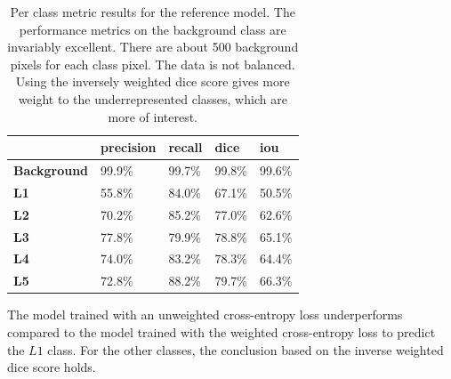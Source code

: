 \begin{table}
    \begin{tabular}{l|llll}
        \toprule
        & \textbf{precision} & \textbf{recall} & \textbf{dice} & \textbf{iou} \\ \hline
        \textbf{Background} & 99.9\%             & 99.7\%          & 99.8\%        & 99.6\%       \\
        \textbf{L1}         & 55.8\%             & 84.0\%          & 67.1\%        & 50.5\%       \\
        \textbf{L2}         & 70.2\%             & 85.2\%          & 77.0\%        & 62.6\%       \\
        \textbf{L3}         & 77.8\%             & 79.9\%          & 78.8\%        & 65.1\%       \\
        \textbf{L4}         & 74.0\%             & 83.2\%          & 78.3\%        & 64.4\%       \\
        \textbf{L5}         & 72.8\%             & 88.2\%          & 79.7\%        & 66.3\%      \\
        \bottomrule
        \end{tabular}
    
        \caption{Per class metric results for the reference model. 
        The performance metrics on the background class are invariably excellent. There are about 500 background pixels for each class pixel. The data is not balanced.
        Using the inversely weighted dice score gives more weight to the underrepresented classes, which are more of interest.
        \label{tab:full_performanceTable}
        }
    \end{table}
The model trained with an unweighted cross-entropy loss underperforms compared to the model trained with the weighted cross-entropy loss to predict the $L1$ class.
For the other classes, the conclusion based on the inverse weighted dice score holds.

